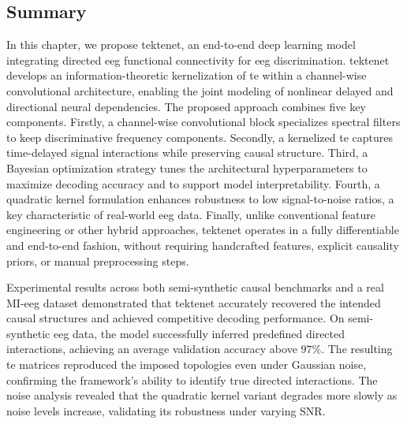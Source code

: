 \subsection{Summary}
\label{sec:Conclu2}

In this chapter, we propose \gls{tektenet}, an end-to-end deep learning model integrating directed \gls{eeg} functional connectivity for \gls{eeg} discrimination. \gls{tektenet} develops an information-theoretic kernelization of \gls{te} within a channel-wise convolutional architecture, enabling the joint modeling of nonlinear delayed and directional neural dependencies. The proposed approach combines five key components. Firstly, a channel-wise convolutional block specializes spectral filters to keep discriminative frequency components. Secondly, a kernelized \gls{te} captures time-delayed signal interactions while preserving causal structure. Third, a Bayesian optimization strategy tunes the architectural hyperparameters to maximize decoding accuracy and to support model interpretability. Fourth, a quadratic kernel formulation enhances robustness to low signal-to-noise ratios, a key characteristic of real-world \gls{eeg} data. Finally, unlike conventional feature engineering or other hybrid approaches, \gls{tektenet} operates in a fully differentiable and end-to-end fashion, without requiring handcrafted features, explicit causality priors, or manual preprocessing steps.

Experimental results across both semi-synthetic causal benchmarks and a real MI-\gls{eeg} dataset demonstrated that \gls{tektenet} accurately recovered the intended causal structures and achieved competitive decoding performance. On semi-synthetic \gls{eeg} data, the model successfully inferred predefined directed interactions, achieving an average validation accuracy above $97\%$. The resulting \gls{te} matrices reproduced the imposed topologies even under Gaussian noise, confirming the framework's ability to identify true directed interactions. The noise analysis revealed that the quadratic kernel variant degrades more slowly as noise levels increase, validating its robustness under varying SNR.

